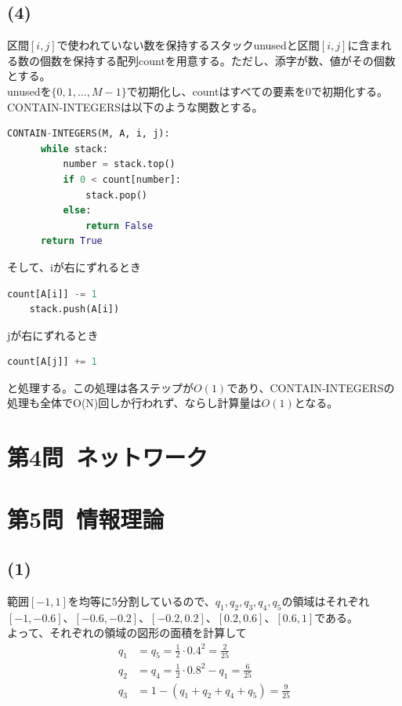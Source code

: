 \documentclass[a4paper,12pt,xelatex,ja=standard]{bxjsarticle}
\begin{document}
  \subsection*{(4)}
  区間$[i, j]$で使われていない数を保持するスタックunusedと区間$[i, j]$に含まれる数の個数を保持する配列countを用意する。ただし、添字が数、値がその個数とする。\\
  unusedを$\{0, 1, \dots, M-1\}$で初期化し、countはすべての要素を$0$で初期化する。\\
  CONTAIN-INTEGERSは以下のような関数とする。
  \begin{lstlisting}[language=Python]
  CONTAIN-INTEGERS(M, A, i, j):
      while stack:
          number = stack.top()
          if 0 < count[number]:
              stack.pop()
          else:
              return False
      return True
  \end{lstlisting}
  そして、iが右にずれるとき
  \begin{lstlisting}[language=Python]
    count[A[i]] -= 1
    stack.push(A[i])
  \end{lstlisting}
  jが右にずれるとき
  \begin{lstlisting}[language=Python]
    count[A[j]] += 1
  \end{lstlisting}
  と処理する。この処理は各ステップが$O(1)$であり、CONTAIN-INTEGERSの処理も全体でO(N)回しか行われず、ならし計算量は$O(1)$となる。

\section*{第4問\ ネットワーク}

\section*{第5問\ 情報理論}
  \subsection*{(1)}
  範囲$[-1, 1]$を均等に5分割しているので、$q_1,q_2,q_3,q_4,q_5$の領域はそれぞれ$[-1, -0.6]$、$[-0.6, -0.2]$、$[-0.2, 0.2]$、$[0.2, 0.6]$、$[0.6, 1]$である。\\
  よって、それぞれの領域の図形の面積を計算して
  \begin{equation*}
    \begin{split}
      q_1 &= q_5 = \frac{1}{2} \cdot 0.4^{2} = \frac{2}{25} \\
      q_2 &= q_4 = \frac{1}{2} \cdot 0.8^{2}  - q_1 = \frac{6}{25} \\
      q_3 &= 1 - (q_1 + q_2 + q_4 + q_5) = \frac{9}{25}
    \end{split}
  \end{equation*}
\end{document}
